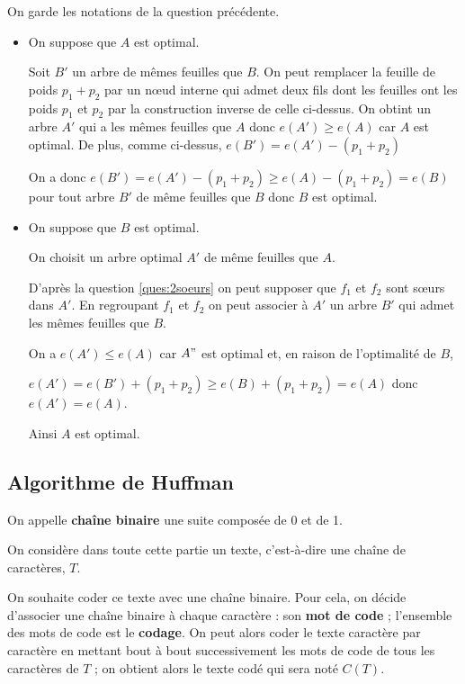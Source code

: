 \begin{Answer}On garde les notations de la question précédente.

\begin{itemize}
\item On suppose que $A$ est optimal.
 
Soit $B'$ un arbre de mêmes feuilles que $B$. On peut remplacer la feuille de poids $p_1+p_2$ par un nœud interne qui admet deux fils dont les feuilles ont les poids $p_1$ et $p_2$ par la construction inverse de celle ci-dessus. On obtint un arbre $A'$ qui a les mêmes feuilles que $A$ donc $e(A') \ge e(A)$ car $A$ est optimal. De plus, comme ci-dessus, $e(B') = e(A')-(p_1+p_2)$

On a donc $e(B') = e(A')-(p_1+p_2) \ge e(A)-(p_1+p_2) = e(B)$ pour tout arbre $B'$ de même feuilles que $B$ donc $B$ est optimal.

\item On suppose que $B$ est optimal.

On choisit un arbre optimal $A'$ de même feuilles que $A$. 

D'après la question \ref{ques:2soeurs} on peut supposer que $f_1$ et $f_2$ sont sœurs dans $A'$.
En regroupant $f_1$ et $f_2$ on peut associer à $A'$ un arbre $B'$ qui admet les mêmes feuilles que $B$.

On a $e(A') \le e(A)$ car $A"$ est optimal et, en raison de l'optimalité de $B$,

$e(A')= e(B') + (p_1+p_2) \ge e(B) + (p_1+p_2) =e(A)$ donc $e(A')=e(A)$.

Ainsi $A$ est optimal.
\end{itemize}
\end{Answer}
\subsection{Algorithme de Huffman}
On appelle {\bf chaîne binaire} une suite composée de 0 et de 1.

On considère dans toute cette partie un texte, c'est-à-dire une chaîne de caractères, $T$.

On souhaite coder ce texte avec une chaîne binaire. Pour cela, on décide d’associer une chaîne binaire à chaque
caractère : son {\bf mot de code} ; l’ensemble des mots de code est le {\bf codage}. On peut alors coder le texte caractère par caractère en mettant bout à bout successivement les mots de code de tous les caractères de $T$ ; on obtient alors le texte codé qui sera noté $C(T)$.

